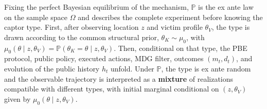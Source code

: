 \documentclass[12pt,a4paper]{article}
\theoremstyle{plain}
\theoremstyle{definition}
\theoremstyle{remark}
\newcommand{\ProbE}{\mathbb{P}}
\newcommand{\1}{\mathbf{1}}
\begin{document}
Fixing the perfect Bayesian equilibrium of the mechanism, $\ProbE$ is the ex ante law
on the sample space $\Omega$ and describes the complete experiment before knowing the
captor type. First, after observing location $z$ and victim profile $\theta_V$, the type
is drawn according to the common structural prior, $\theta_K\sim\mu_0$, with
$\mu_0(\theta\mid z,\theta_V)=\ProbE(\theta_K=\theta\mid z,\theta_V)$. Then, conditional
on that type, the PBE protocol, public policy, executed actions, MDG filter, outcomes
$(m_t,d_t)$, and evolution of the public history $h_t$ unfold. Under $\ProbE$, the type
is ex ante random and the observable trajectory is interpreted as a \textbf{mixture} of
realizations compatible with different types, with initial marginal conditional on
$(z,\theta_V)$ given by $\mu_0(\theta\mid z,\theta_V)$.
\end{document}
